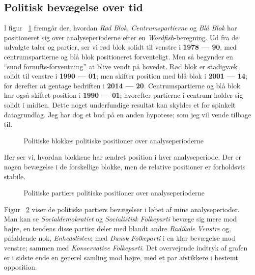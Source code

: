  \subsection{Politisk bevægelse over tid}

I figur ~\ref{fig:fish_blocXperiod} fremgår der, hvordan \textit{Rød Blok}, \textit{Centrumspartierne} og \textit{Blå Blok} har positioneret sig over analyseperioderne efter en \textit{Wordfish}-beregning.
Ud fra de udvalgte taler og partier, ser vi rød blok solidt til venstre i \textbf{1978 --- 90}, med centrumspartierne og blå blok positioneret forventeligt.
Men så begynder en “sund fornufts-forventning” at blive vendt på hovedet.
Rød blok er stadigvæk solidt til venstre i \textbf{1990 --- 01}; men skifter position med blå blok i \textbf{2001 --- 14}; for derefter at gentage bedriften i \textbf{2014 --- 20}.
Centrumspartierne og blå blok har også skiftet position i \textbf{1990 --- 01}; hvorefter partierne i centrum holder sig solidt i midten.
Dette noget underfundige resultat kan skyldes et for spinkelt datagrundlag.
Jeg har dog et bud på en anden hypotese; som jeg vil vende tilbage til.

\begin{figure}
 
\caption{Politiske blokkes politiske positioner over analyseperioderne}
\label{fig:fish_blocXperiod}
\end{figure}Her ser vi, hvordan blokkene har ændret position i hver analyseperiode.
Der er nogen bevægelse i de forskellige blokke, men de relative positioner er forholdsvis stabile. 

\begin{figure}
\begin{adjustwidth}{-1in}{-1in}
 
\end{adjustwidth}
\caption{Politiske partiers politiske positioner over analyseperioderne}
\label{fig:fish_partyXperiod}
\end{figure}

Figur ~\ref{fig:fish_partyXperiod} viser de politiske partiers bevægelser i løbet af mine analyseperioder.
Man kan se \textit{Socialdemokratiet} og \textit{Socialistisk Folkeparti} bevæge sig mere mod højre, en tendens disse partier deler med blandt andre \textit{Radikale Venstre} og, påfaldende nok, \textit{Enhedslisten}; med \textit{Dansk Folkeparti} i en klar bevægelse mod venstre; sammen med \textit{Konservative Folkeparti}.
Det overvejende indtryk af grafen er i sidste ende en generel samling mod højre, med et par afstikkere i bestemt opposition.

